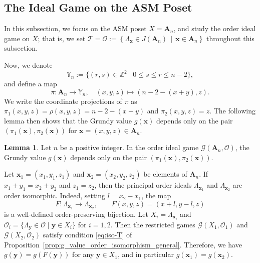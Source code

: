 \documentclass[a4paper,11pt]{amsart}
\theoremstyle{definition}
\newtheorem{lem}{Lemma}[section]
\newenvironment{demo}[1]{%
  \trivlist
  \item[\hskip\labelsep
        {\bf #1.}]
}{%
\hfill\qedsymbol
  \endtrivlist
}
\numberwithin{equation}{section}
\def\Int{\mathbb{Z}}
\def\T{\mathscr{T}}
\def\OI{\mathscr{O}}
\def\ASM#1{\boldsymbol{A}_{#1}}
\def\Y#1{\mathbb{Y}_{#1}}
\def\x{\boldsymbol{x}}
\def\y{\boldsymbol{y}}
\def\rkf{\rho}
\begin{document}
\subsection{The Ideal Game on the ASM Poset}\label{sbsec:ASM-ideal}
%
In this subsection, we focus on the ASM poset $X=\ASM{n}$,
and study the order ideal game on $X$; that is, we set
$
	\T=\OI
	:=
	\left\{
		{\Lambda}_{ \boldsymbol{x} } \in J\left( \ASM{n} \right)
	\,\middle| \,
		\boldsymbol{x} \in \ASM{n}
	\right\}
$
throughout this subsection.
%
\par
%
Now,
we denote 
%
\begin{equation*}
	\Y{n}:=\{
		(r, s) \in \Int^{2}
	\mid
		0 \leq s \leq r \leq n - 2
	\},
\end{equation*}
%
and define a map
%
\begin{equation*}
\pi \colon \ASM{n} \rightarrow \Y{n}
,\quad
\left( x, y, z \right) \mapsto \left( n - 2 - (x + y), z \right).
\end{equation*}
We write the coordinate projections of $\pi$ as
$\pi_{1}\left( x, y, z \right)=\rkf(x,y,z)=n - 2 - (x + y)$
and $\pi_{2}\left( x, y, z \right)=z$.
The following lemma then shows that the Grundy value $g\left(\x\right)$ 
depends only on the pair $\left(\pi_{1}\left(\x\right),\pi_{2}\left(\x\right)\right)$ for $\x=(x,y,z)\in \ASM{n}$.
%
\begin{lem}\label{lem:g_value_isomorphic}
Let $n$ be a positive integer.
	In the order ideal game 
	$\mathscr{G}\left( \ASM{n}, \OI \right)$,
	the Grundy value $g\left( \x \right)$ depends only on the pair $\left(\pi_{1}(\x),\pi_{2}(\x)\right)$.
\end{lem}
%
\begin{demo}{Proof}
Let $\x_{1}=\left( x_{1}, y_{1}, z_{1} \right)$ and $\x_{2}=\left( x_{2}, y_{2}, z_{2} \right)$ be elements of $\ASM{n}$.
If 
$x_{1} + y_{1} = x_{2} + y_{2}$ 
and $z_{1} = z_{2}$,
then the principal order ideals
$\Lambda_{\x_{1}}$ and $\Lambda_{\x_{2}}$ are order isomorphic.
%
Indeed, setting $l=x_{2} - x_{1}$,
the map
\[
F \colon \Lambda_{\x_{1}} \rightarrow \Lambda_{\x_{2}}
,\qquad
F\left( x, y, z \right)=\left( x + l, y - l, z \right)
\]
is a well-defined order-preserving bijection.
%
Let $X_{i}=\Lambda_{\x_{i}}$ and $\OI_{i}=\{\Lambda_{\y}\in\OI\mid \y\in X_{i}\}$ for $i=1,2$.
Then the restricted games $\mathscr{G}\left( X_{1}, \OI_{1} \right)$ and $\mathscr{G}\left( X_{2}, \OI_{2} \right)$
satisfy condition \eqref{eq:iso-T} of Proposition~\ref{prop:g_value_order_isomorphism_general}.
Therefore, we have $g(\y)=g\left(F(\y)\right)$ for any $\y\in X_{1}$,
and in particular $g(\x_{1})=g(\x_{2})$.
%
\end{demo}
\end{document}

